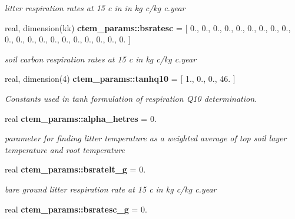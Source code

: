 \begin{DoxyCompactItemize}
\begin{DoxyCompactList}\small\item\em litter respiration rates at 15 c in in kg c/kg c.\+year \end{DoxyCompactList}\item 
\hypertarget{namespacectem__params_a25b64781ac846ded3ac9024e4b4074bb}{}real, dimension(kk) {\bfseries ctem\+\_\+params\+::bsratesc} = \mbox{[} 0., 0., 0., 0., 0., 0., 0., 0., 0., 0., 0., 0., 0., 0., 0., 0., 0., 0., 0., 0. \mbox{]}\label{namespacectem__params_a25b64781ac846ded3ac9024e4b4074bb}

\begin{DoxyCompactList}\small\item\em soil carbon respiration rates at 15 c in kg c/kg c.\+year \end{DoxyCompactList}\item 
\hypertarget{namespacectem__params_a04f581d88bb99a2d4d4128f684a46ba6}{}real, dimension(4) {\bfseries ctem\+\_\+params\+::tanhq10} = \mbox{[} 1., 0., 0., 46. \mbox{]}\label{namespacectem__params_a04f581d88bb99a2d4d4128f684a46ba6}

\begin{DoxyCompactList}\small\item\em Constants used in tanh formulation of respiration Q10 determination. \end{DoxyCompactList}\item 
\hypertarget{namespacectem__params_a403de9621ddedbe9dcc984bb874e8298}{}real {\bfseries ctem\+\_\+params\+::alpha\+\_\+hetres} = 0.\label{namespacectem__params_a403de9621ddedbe9dcc984bb874e8298}

\begin{DoxyCompactList}\small\item\em parameter for finding litter temperature as a weighted average of top soil layer temperature and root temperature \end{DoxyCompactList}\item 
\hypertarget{namespacectem__params_af429d00148e673d58d18e9d3a419ee66}{}real {\bfseries ctem\+\_\+params\+::bsratelt\+\_\+g} = 0.\label{namespacectem__params_af429d00148e673d58d18e9d3a419ee66}

\begin{DoxyCompactList}\small\item\em bare ground litter respiration rate at 15 c in kg c/kg c.\+year \end{DoxyCompactList}\item 
\hypertarget{namespacectem__params_a3b130e3b7506998094c8650ea4d26ff7}{}real {\bfseries ctem\+\_\+params\+::bsratesc\+\_\+g} = 0.\label{namespacectem__params_a3b130e3b7506998094c8650ea4d26ff7}


\end{DoxyCompactItemize}
